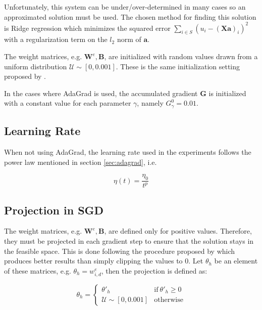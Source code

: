 Unfortunately, this system can be under/over-determined in many cases so an approximated solution must be used. The chosen method for finding this solution is Ridge regression which minimizes the squared error $\sum_{i \in S}(u_{i} - (\mathbf{X}\mathbf{a})_{i})^{2}$ with a regularization term on the $l_{2}$ norm of $\mathbf{a}$.

The weight matrices, e.g. $\mathbf{W}^{e}, \mathbf{B}$, are initialized with random values drawn from a uniform distribution $\mathcal{U} \sim [0, 0.001]$. These is the same initialization setting proposed by \citet{tschiatschek16learning}.

In the cases where AdaGrad is used, the accumulated gradient $\mathbf{G}$ is initialized with a constant value for each parameter $\gamma$, namely $G^{0}_{\gamma} = 0.01$.

\subsection{Learning Rate}

When not using AdaGrad, the learning rate used in the experiments follows the power law mentioned in section \ref{sec:adagrad}, i.e.

\begin{equation}
  \eta(t) = \frac{\eta_{0}}{t^{p}}
\end{equation}

\subsection{Projection in SGD}

The weight matrices, e.g. $\mathbf{W}^{e}, \mathbf{B}$, are defined only for positive values. Therefore, they must be projected in each gradient step to ensure that the solution stays in the feasible space. This is done following the procedure proposed by \citet{tschiatschek16learning} which produces better results than simply clipping the values to 0. Let $\theta_{h}$ be an element of these matrices, e.g. $\theta_{h} = w^{e}_{i,d}$, then the projection is defined as:

\begin{equation}
  \theta_{h} = \begin{cases}
    \theta'_{h} & \text{if}\ \theta'_{h} \geq 0 \\
    \mathcal{U} \sim [0, 0.001] & \text{otherwise}
  \end{cases}
\end{equation}

